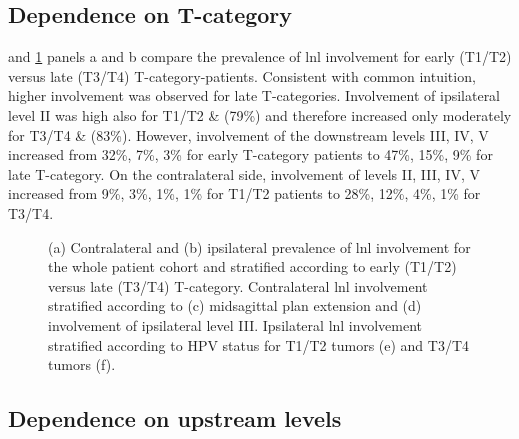 \documentclass[\relativeRoot/main.tex]{subfiles}
\begin{document}
\subsection*{Dependence on T-category}

 and \cref{fig:dataset:statistics} panels a and b compare the prevalence of \gls{lnl} involvement for early (T1/T2) versus late (T3/T4) T-category-patients. Consistent with common intuition, higher involvement was observed for late T-categories. Involvement of ipsilateral level II was high also for T1/T2 \& (79\%) and therefore increased only moderately for T3/T4 \& (83\%). However, involvement of the downstream levels III, IV, V increased from 32\%, 7\%, 3\% for early T-category patients to 47\%, 15\%, 9\% for late T-category. On the contralateral side, involvement of levels II, III, IV, V increased from 9\%, 3\%, 1\%, 1\% for T1/T2 patients to 28\%, 12\%, 4\%, 1\% for T3/T4.

\begin{figure}
    \centering
    \def\svgwidth{1.0\textwidth}
    
    \caption[Statistics that characterize the presented cohort of OPSCC patients]{(a) Contralateral and (b) ipsilateral prevalence of \gls{lnl} involvement for the whole patient cohort and stratified according to early (T1/T2) versus late (T3/T4) T-category. Contralateral \gls{lnl} involvement stratified according to (c) midsagittal plan extension and (d) involvement of ipsilateral level III. Ipsilateral \gls{lnl} involvement stratified according to HPV status for T1/T2 tumors (e) and T3/T4 tumors (f).}
    \label{fig:dataset:statistics}
\end{figure}

\subsection*{Dependence on upstream levels}
\end{document}
